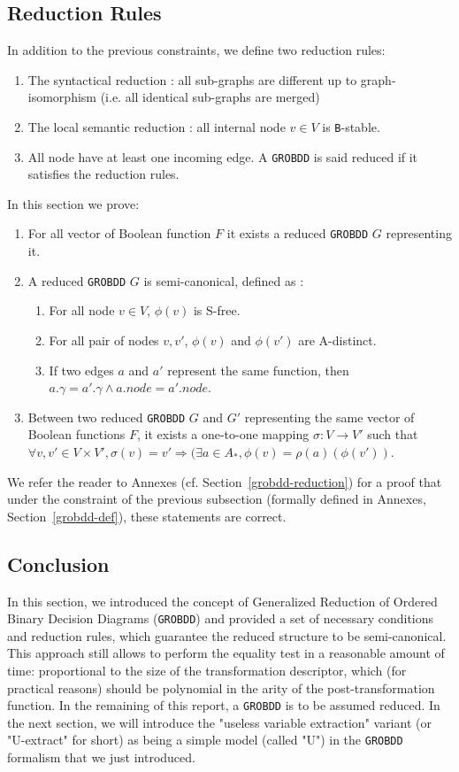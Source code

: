 \documentclass[a4paper,10pt]{article}
\newcommand{\GroBdd}{\texttt{GROBDD}}
\begin{document}
\subsection{Reduction Rules}
In addition to the previous constraints, we define two reduction rules:\begin{enumerate}
\item The syntactical reduction : all sub-graphs are different up to graph-isomorphism (i.e. all identical sub-graphs are merged)
\item The local semantic reduction : all internal node $v\in V$ is \texttt{B}-stable.
\item All node have at least one incoming edge.
A \GroBdd{} is said reduced if it satisfies the reduction rules.
\end{enumerate}
In this section we prove:\begin{enumerate}
\item For all vector of Boolean function $F$ it exists a reduced \GroBdd{} $G$ representing it.
\item A reduced \GroBdd{} $G$ is semi-canonical, defined as :\begin{enumerate}
\item For all node $v\in V$, $\phi(v)$ is S-free.
\item For all pair of nodes $v, v'$, $\phi(v)$ and $\phi(v')$ are A-distinct.
\item If two edges $a$ and $a'$ represent the same function, then $a.\gamma = a'.\gamma \land a.node = a'.node$.
\end{enumerate}
\item Between two reduced \GroBdd{} $G$ and $G'$ representing the same vector of Boolean functions $F$, it exists a one-to-one mapping $\sigma : V \longrightarrow V'$ such that $\forall v, v' \in V \times V', \sigma(v) = v' \Rightarrow (\exists a \in A_{*}, \phi(v) = \rho(a)(\phi(v'))$.
\end{enumerate}

We refer the reader to Annexes (cf. Section~\ref{grobdd-reduction}) for a proof that under the constraint of the previous subsection (formally defined in Annexes, Section~\ref{grobdd-def}), these statements are correct.

\subsection{Conclusion}

In this section, we introduced the concept of Generalized Reduction of Ordered Binary Decision Diagrams (\GroBdd{}) and provided a set of necessary conditions and reduction rules, which guarantee the reduced structure to be semi-canonical. This approach still allows to perform the equality test in a reasonable amount of time: proportional to the size of the transformation descriptor, which (for practical reasons) should be polynomial in the arity of the post-transformation function.
In the remaining of this report, a \GroBdd{} is to be assumed reduced.
In the next section, we will introduce the "useless variable extraction" variant (or "U-extract" for short) as being a simple model (called "U") in the \GroBdd{} formalism that we just introduced.
\end{document}
